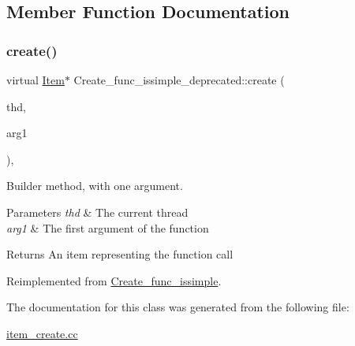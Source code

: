 \subsection{Member Function Documentation}
\mbox{\label{classCreate__func__issimple__deprecated_a58df8393700d5dfea4493b0568fa94f6}} 
\subsubsection{\texorpdfstring{create()}{create()}}
{\footnotesize\ttfamily virtual \mbox{\hyperlink{classItem}{Item}}$\ast$ Create\+\_\+func\+\_\+issimple\+\_\+deprecated\+::create (\begin{DoxyParamCaption}\item[{T\+HD $\ast$}]{thd,  }\item[{\mbox{\hyperlink{classItem}{Item}} $\ast$}]{arg1 }\end{DoxyParamCaption})\hspace{0.3cm}{\ttfamily [inline]}, {\ttfamily [virtual]}}

Builder method, with one argument. 
\begin{DoxyParams}{Parameters}
{\em thd} & The current thread \\
\hline
{\em arg1} & The first argument of the function \\
\hline
\end{DoxyParams}
\begin{DoxyReturn}{Returns}
An item representing the function call 
\end{DoxyReturn}


Reimplemented from \mbox{\hyperlink{classCreate__func__issimple_af481363c8e501313e097212ada345419}{Create\+\_\+func\+\_\+issimple}}.



The documentation for this class was generated from the following file\+:\begin{DoxyCompactItemize}
\item 
\mbox{\hyperlink{item__create_8cc}{item\+\_\+create.\+cc}}\end{DoxyCompactItemize}
